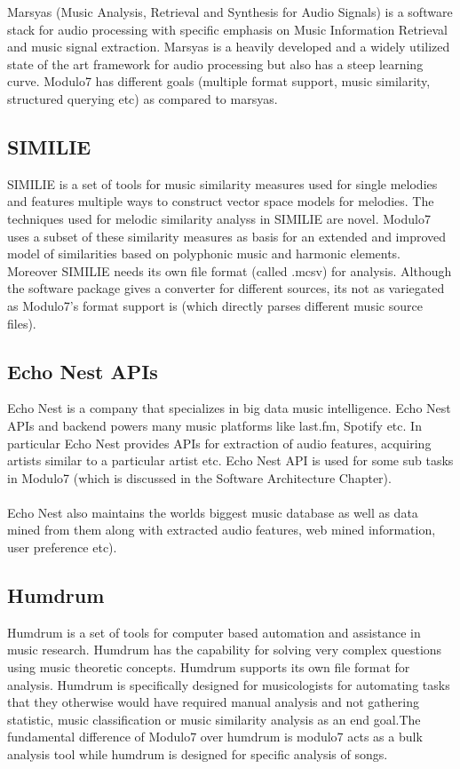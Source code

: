 \noindent Marsyas \cite{marsyas} (Music Analysis, Retrieval and Synthesis for Audio Signals) is a software stack for audio processing with specific emphasis on Music Information Retrieval and music signal extraction. Marsyas is a heavily developed and a widely utilized state of the art framework for audio processing but also has a steep learning curve. Modulo7 has different goals (multiple format support, music similarity, structured querying etc) as compared to marsyas.

\subsection{SIMILIE}

\noindent SIMILIE \cite{similie} is a set of tools for music similarity measures used for single  melodies and features multiple ways to construct vector space models for melodies. The techniques used for melodic similarity analyss in SIMILIE are novel. Modulo7 uses a subset of these similarity measures as basis for an extended and improved model of similarities based on polyphonic music and harmonic elements. Moreover SIMILIE needs its own file format (called .mcsv) for analysis. Although the software package gives a converter for different sources, its not as variegated as Modulo7's format support is (which directly parses different music source files).

\subsection{Echo Nest APIs}

\noindent Echo Nest is a company that specializes in big data music intelligence. Echo Nest APIs and backend powers many music platforms like last.fm, Spotify etc. In particular Echo Nest provides APIs for extraction of audio features, acquiring artists similar to a particular artist etc. Echo Nest API is used for some sub tasks in Modulo7 (which is discussed in the Software Architecture Chapter). \\\\
Echo Nest also maintains the worlds biggest music database as well as data mined from them along with extracted audio features, web mined information, user preference etc). 

\subsection{Humdrum}

\noindent Humdrum \cite{humdrum} is a set of tools for computer based automation and assistance in music research. Humdrum has the capability for solving very complex questions using music theoretic concepts. Humdrum supports its own file format for analysis. Humdrum is specifically designed for musicologists for automating tasks that they otherwise would have required manual analysis and not gathering statistic, music classification or music similarity analysis as an end goal.The fundamental difference of Modulo7 over humdrum is modulo7 acts as a bulk analysis tool while humdrum is designed for specific analysis of songs.


